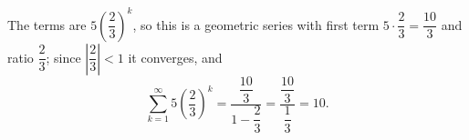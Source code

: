 The terms are $5\left(\dfrac{2}{3}\right)^k$, so this is a geometric series with first term $5\cdot\dfrac{2}{3}=\dfrac{10}{3}$ and ratio $\dfrac{2}{3}$; since $\left|\dfrac{2}{3}\right|<1$ it converges, and
\[
\sum_{k=1}^{\infty}5\left(\dfrac{2}{3}\right)^k=\dfrac{\dfrac{10}{3}}{1-\dfrac{2}{3}}=\dfrac{\dfrac{10}{3}}{\dfrac{1}{3}}=\boxed{10}.
\]
